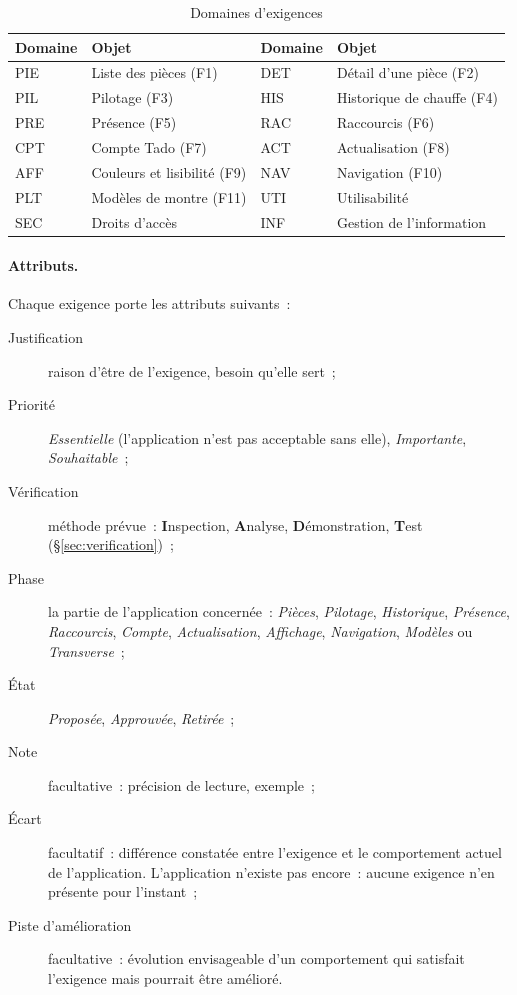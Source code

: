 \begin{table}[H]
  \centering\small
  \begin{tabular}{@{}llll@{}}
    \toprule
    \textbf{Domaine} & \textbf{Objet} & \textbf{Domaine} & \textbf{Objet} \\
    \midrule
    PIE & Liste des pièces (F1)        & DET & Détail d'une pièce (F2) \\
    PIL & Pilotage (F3)                & HIS & Historique de chauffe (F4) \\
    PRE & Présence (F5)                & RAC & Raccourcis (F6) \\
    CPT & Compte Tado (F7)             & ACT & Actualisation (F8) \\
    AFF & Couleurs et lisibilité (F9) & NAV & Navigation (F10) \\
    PLT & Modèles de montre (F11)      & UTI & Utilisabilité \\
    SEC & Droits d'accès               & INF & Gestion de l'information \\
    \bottomrule
  \end{tabular}
  \caption{Domaines d'exigences}
\end{table}

\paragraph{Attributs.} Chaque exigence porte les attributs suivants~:
\begin{description}
  \item[Justification] raison d'être de l'exigence, besoin qu'elle sert~;
  \item[Priorité] \textit{Essentielle} (l'application n'est pas acceptable sans elle), \textit{Importante}, \textit{Souhaitable}~;
  \item[Vérification] méthode prévue~: \textbf{I}nspection, \textbf{A}nalyse,
    \textbf{D}émonstration, \textbf{T}est (§\ref{sec:verification})~;
  \item[Phase] la partie de l'application concernée~: \textit{Pièces}, \textit{Pilotage},
    \textit{Historique}, \textit{Présence}, \textit{Raccourcis},
    \textit{Compte}, \textit{Actualisation}, \textit{Affichage},
    \textit{Navigation}, \textit{Modèles} ou \textit{Transverse}~;
  \item[État] \textit{Proposée}, \textit{Approuvée}, \textit{Retirée}~;
  \item[Note] facultative~: précision de lecture, exemple~;
  \item[Écart] facultatif~: différence constatée entre l'exigence et le comportement actuel
    de l'application. L'application n'existe pas encore~: aucune exigence n'en présente
    pour l'instant~;
  \item[Piste d'amélioration] facultative~: évolution envisageable d'un comportement qui
    satisfait l'exigence mais pourrait être amélioré.
\end{description}

